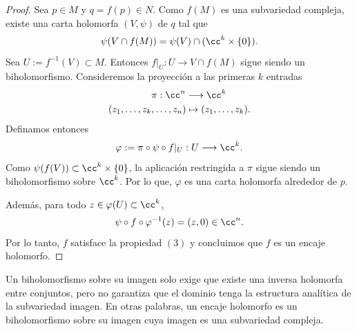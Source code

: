 \begin{proof}
  			Sea $p\in M$ y $q=f(p)\in N$. Como $f(M)$ es una subvariedad compleja, existe una carta holomorfa $(V,\psi)$ de $q$ tal que
  			\begin{equation*}
  				\psi(V\cap f(M))=\psi(V)\cap (\cc^k\times \{0\}).
  			\end{equation*} 
  			Sea $U:=f^{-1}(V)\subset M$. Entonces $f|_U:U\to V\cap f(M)$ sigue siendo un biholomorfismo. Consideremos la proyección a las primeras $k$ entradas
  			\begin{align*}
  				&\pi:\cc^n\longrightarrow \cc^k\\
  				(z_1,\dots,z_k&,\dots,z_n)\mapsto (z_1,\dots, z_k).
  			\end{align*} 
  			Definamos entonces 
  			\begin{equation*}
  				\varphi:=\pi\circ \psi\circ f|_U:U\longrightarrow\cc^k.
  			\end{equation*}
    		Como $\psi(f(V))\subset \cc^k\times \{0\}$, la aplicación restringida a $\pi$ sigue siendo un biholomorfismo sobre $\cc^k$. Por lo que, $\varphi$ es una carta holomorfa alrededor de $p$.
    		
    		Además, para todo $z\in\varphi(U)\subset\cc^k$, 
    		\begin{equation*}
    			\psi\circ f\circ \varphi^{-1}(z)=(z,0)\in\cc^n.
    		\end{equation*}
    		Por lo tanto, $f$ satisface la propiedad $(3)$ y concluimos que $f$ es un encaje holomorfo. 
    \end{proof}
    
    Un biholomorfismo sobre su imagen solo exige que existe una inversa holomorfa entre conjuntos, pero no garantiza que el dominio tenga la estructura analítica de la subvariedad imagen. En otras palabras, un encaje holomorfo es un biholomorfismo sobre su imagen cuya imagen es una subvariedad compleja. 
    
%      	
   	
